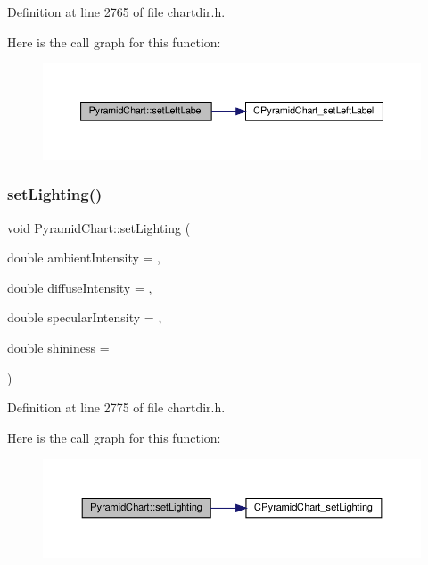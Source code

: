 Definition at line 2765 of file chartdir.\+h.

Here is the call graph for this function\+:
\nopagebreak
\begin{figure}[H]
\begin{center}
\leavevmode
\includegraphics[width=350pt]{class_pyramid_chart_a0ddce92ecb98662bdc6cb7c9538353ee_cgraph}
\end{center}
\end{figure}
\mbox{\label{class_pyramid_chart_ad86b26cd02267eb566d402a0a1fafb80}} 
\subsubsection{\texorpdfstring{set\+Lighting()}{setLighting()}}
{\footnotesize\ttfamily void Pyramid\+Chart\+::set\+Lighting (\begin{DoxyParamCaption}\item[{double}]{ambient\+Intensity = {},  }\item[{double}]{diffuse\+Intensity = {},  }\item[{double}]{specular\+Intensity = {},  }\item[{double}]{shininess = {} }\end{DoxyParamCaption})\hspace{0.3cm}{\ttfamily [inline]}}



Definition at line 2775 of file chartdir.\+h.

Here is the call graph for this function\+:
\nopagebreak
\begin{figure}[H]
\begin{center}
\leavevmode
\includegraphics[width=350pt]{class_pyramid_chart_ad86b26cd02267eb566d402a0a1fafb80_cgraph}
\end{center}
\end{figure}
\mbox{\label{class_pyramid_chart_af7e6a941c23f36996ee7e5aea4d3ba9b}} 
